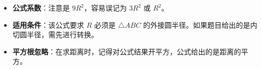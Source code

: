 \begin{trapbox}
\begin{itemize}
    \item \textbf{公式系数}：注意是 $9R^2$，容易误记为 $3R^2$ 或 $R^2$。
    \item \textbf{适用条件}：该公式要求 $R$ 必须是 $\triangle ABC$ 的外接圆半径。如果题目给出的是内切圆半径，需先进行转换。
    \item \textbf{平方根忽略}：在求距离时，记得对公式结果开平方，公式给出的是距离的平方。
\end{itemize}
\end{trapbox}